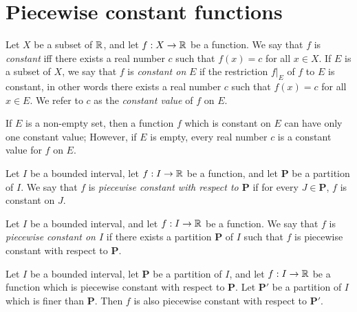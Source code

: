\section{Piecewise constant functions}\label{i:sec:11.2}

\begin{defn}\label{i:11.2.1}
  Let \(X\) be a subset of \(\mathbb{R}\), and let \(f : X \to \mathbb{R}\) be a function.
  We say that \(f\) is \emph{constant} iff there exists a real number \(c\) such that \(f(x) = c\) for all \(x \in X\).
  If \(E\) is a subset of \(X\), we say that \(f\) is \emph{constant on} \(E\) if the restriction \(f|_E\) of \(f\) to \(E\) is constant, in other words there exists a real number \(c\) such that \(f(x) = c\) for all \(x \in E\).
  We refer to \(c\) as the \emph{constant value} of \(f\) on \(E\).
\end{defn}

\begin{rmk}\label{i:11.2.2}
  If \(E\) is a non-empty set, then a function \(f\) which is constant on \(E\) can have only one constant value;
  However, if \(E\) is empty, every real number \(c\) is a constant value for \(f\) on \(E\).
\end{rmk}

\begin{defn}\label{i:11.2.3}
  Let \(I\) be a bounded interval, let \(f : I \to \mathbb{R}\) be a function, and let \(\mathbf{P}\) be a partition of \(I\).
  We say that \(f\) is \emph{piecewise constant with respect to \(\mathbf{P}\)} if for every \(J \in \mathbf{P}\), \(f\) is constant on \(J\).
\end{defn}

\setcounter{thm}{4}
\begin{defn}\label{i:11.2.5}
  Let \(I\) be a bounded interval, and let \(f : I \to \mathbb{R}\) be a function.
  We say that \(f\) is \emph{piecewise constant on \(I\)} if there exists a partition \(\mathbf{P}\) of \(I\) such that \(f\) is piecewise constant with respect to \(\mathbf{P}\).
\end{defn}

\setcounter{thm}{6}
\begin{lem}\label{i:11.2.7}
  Let \(I\) be a bounded interval, let \(\mathbf{P}\) be a partition of \(I\), and let \(f : I \to \mathbb{R}\) be a function which is piecewise constant with respect to \(\mathbf{P}\).
  Let \(\mathbf{P}'\) be a partition of \(I\) which is finer than \(\mathbf{P}\).
  Then \(f\) is also piecewise constant with respect to \(\mathbf{P}'\).
\end{lem}

